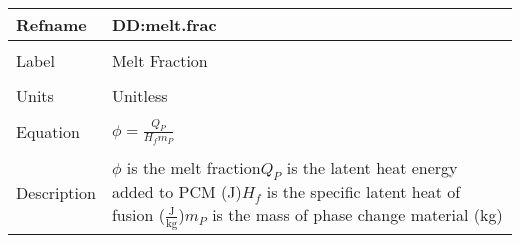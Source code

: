 \documentclass[12pt]{article}
\begin{document}
~\newline
\noindent \begin{minipage}{\textwidth}
\begin{tabular}{p{} p{}}
\toprule \textbf{Refname} & \textbf{DD:melt.frac}
\label{DD:melt.frac}
\\ \midrule \\
Label & Melt Fraction
\\ \midrule \\
Units & Unitless
\\ \midrule \\
Equation & $ϕ=\frac{{Q_{P}}}{{H_{f}} {m_{P}}}$
\\ \midrule \\
Description & $ϕ$ is the melt fraction\newline${Q_{P}}$ is the latent heat energy added to PCM (J)\newline${H_{f}}$ is the specific latent heat of fusion ($\frac{\text{J}}{\text{kg}}$)\newline${m_{P}}$ is the mass of phase change material (kg)
\\ \bottomrule \end{tabular}
\end{minipage}\\
\end{document}
